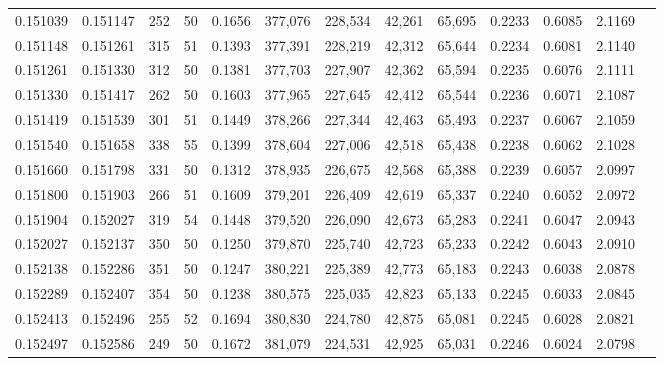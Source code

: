 \begin{tabular}{rrrrrrrrrrrrr}
0.151039 & 0.151147 &   252 &  50 &                                     0.1656 & 377,076 & 228,534 &  42,261 &  65,695 & 0.2233 & 0.6085 & 2.1169 \\
0.151148 & 0.151261 &   315 &  51 &                                     0.1393 & 377,391 & 228,219 &  42,312 &  65,644 & 0.2234 & 0.6081 & 2.1140 \\
0.151261 & 0.151330 &   312 &  50 &                                     0.1381 & 377,703 & 227,907 &  42,362 &  65,594 & 0.2235 & 0.6076 & 2.1111 \\
0.151330 & 0.151417 &   262 &  50 &                                     0.1603 & 377,965 & 227,645 &  42,412 &  65,544 & 0.2236 & 0.6071 & 2.1087 \\
0.151419 & 0.151539 &   301 &  51 &                                     0.1449 & 378,266 & 227,344 &  42,463 &  65,493 & 0.2237 & 0.6067 & 2.1059 \\
0.151540 & 0.151658 &   338 &  55 &                                     0.1399 & 378,604 & 227,006 &  42,518 &  65,438 & 0.2238 & 0.6062 & 2.1028 \\
0.151660 & 0.151798 &   331 &  50 &                                     0.1312 & 378,935 & 226,675 &  42,568 &  65,388 & 0.2239 & 0.6057 & 2.0997 \\
0.151800 & 0.151903 &   266 &  51 &                                     0.1609 & 379,201 & 226,409 &  42,619 &  65,337 & 0.2240 & 0.6052 & 2.0972 \\
0.151904 & 0.152027 &   319 &  54 &                                     0.1448 & 379,520 & 226,090 &  42,673 &  65,283 & 0.2241 & 0.6047 & 2.0943 \\
0.152027 & 0.152137 &   350 &  50 &                                     0.1250 & 379,870 & 225,740 &  42,723 &  65,233 & 0.2242 & 0.6043 & 2.0910 \\
0.152138 & 0.152286 &   351 &  50 &                                     0.1247 & 380,221 & 225,389 &  42,773 &  65,183 & 0.2243 & 0.6038 & 2.0878 \\
0.152289 & 0.152407 &   354 &  50 &                                     0.1238 & 380,575 & 225,035 &  42,823 &  65,133 & 0.2245 & 0.6033 & 2.0845 \\
0.152413 & 0.152496 &   255 &  52 &                                     0.1694 & 380,830 & 224,780 &  42,875 &  65,081 & 0.2245 & 0.6028 & 2.0821 \\
0.152497 & 0.152586 &   249 &  50 &                                     0.1672 & 381,079 & 224,531 &  42,925 &  65,031 & 0.2246 & 0.6024 & 2.0798 \\

\end{tabular}
